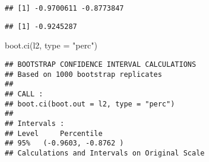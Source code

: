 \documentclass[
]{article}
\newenvironment{Shaded}{\begin{snugshade}}{\end{snugshade}}
\newcommand{\AttributeTok}[1]{\textcolor[rgb]{0.77,0.63,0.00}{#1}}
\newcommand{\CommentTok}[1]{\textcolor[rgb]{0.56,0.35,0.01}{\textit{#1}}}
\newcommand{\ControlFlowTok}[1]{\textcolor[rgb]{0.13,0.29,0.53}{\textbf{#1}}}
\newcommand{\DecValTok}[1]{\textcolor[rgb]{0.00,0.00,0.81}{#1}}
\newcommand{\FunctionTok}[1]{\textcolor[rgb]{0.00,0.00,0.00}{#1}}
\newcommand{\NormalTok}[1]{#1}
\newcommand{\OtherTok}[1]{\textcolor[rgb]{0.56,0.35,0.01}{#1}}
\newcommand{\SpecialCharTok}[1]{\textcolor[rgb]{0.00,0.00,0.00}{#1}}
\newcommand{\StringTok}[1]{\textcolor[rgb]{0.31,0.60,0.02}{#1}}
\begin{document}
\begin{verbatim}
## [1] -0.9700611 -0.8773847
\end{verbatim}

\begin{Shaded}
\end{Shaded}

\begin{verbatim}
## [1] -0.9245287
\end{verbatim}

\begin{Shaded}
\begin{Highlighting}[]
\FunctionTok{boot.ci}\NormalTok{(l2, }\AttributeTok{type =} \StringTok{"perc"}\NormalTok{)}
\end{Highlighting}
\end{Shaded}

\begin{verbatim}
## BOOTSTRAP CONFIDENCE INTERVAL CALCULATIONS
## Based on 1000 bootstrap replicates
## 
## CALL : 
## boot.ci(boot.out = l2, type = "perc")
## 
## Intervals : 
## Level     Percentile     
## 95%   (-0.9603, -0.8762 )  
## Calculations and Intervals on Original Scale
\end{verbatim}
\end{document}
